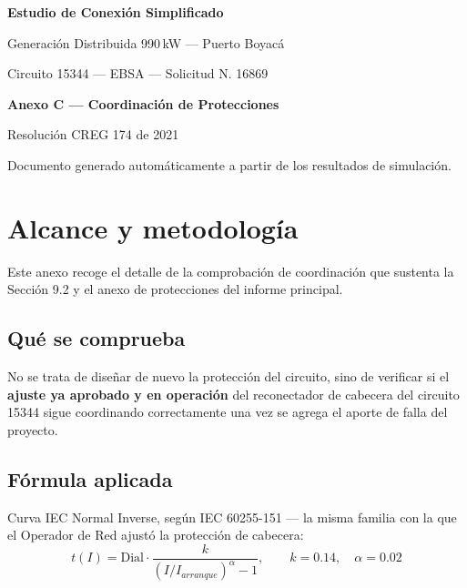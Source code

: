 \documentclass[11pt,a4paper]{article}
\begin{document}
\begin{titlepage}
\centering
\vspace*{3cm}
{\Large\bfseries Estudio de Conexi\'on Simplificado\par}
\vspace{0.4cm}
{\large Generaci\'on Distribuida 990\,kW --- Puerto Boyac\'a\par}
\vspace{0.2cm}
{\large Circuito 15344 --- EBSA --- Solicitud N.\textdegree{} 16869\par}
\vspace{2.5cm}
{\Huge\bfseries Anexo C --- Coordinaci\'on de Protecciones\par}
\vspace{2cm}
{\large Resoluci\'on CREG 174 de 2021\par}
\vfill
{\small Documento generado autom\'aticamente a partir de los resultados de simulaci\'on.\par}
\end{titlepage}

\tableofcontents
\newpage


\section{Alcance y metodolog\'ia}

Este anexo recoge el detalle de la comprobaci\'on de coordinaci\'on que sustenta
la Secci\'on 9.2 y el anexo de protecciones del informe principal.

\subsection{Qu\'e se comprueba}

No se trata de diseñar de nuevo la protecci\'on del circuito, sino de verificar
si el \textbf{ajuste ya aprobado y en operaci\'on} del reconectador de cabecera
del circuito 15344 sigue coordinando correctamente una vez se agrega el aporte
de falla del proyecto.

\subsection{F\'ormula aplicada}

Curva IEC Normal Inverse, seg\'un IEC 60255-151 --- la misma familia con la que
el Operador de Red ajust\'o la protecci\'on de cabecera:
\[
t(I) = \mathrm{Dial} \cdot \frac{k}{\left(I/I_{arranque}\right)^{\alpha} - 1},
\qquad k = 0.14,\quad \alpha = 0.02
\]
\end{document}
